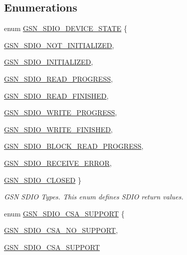 \subsection*{Enumerations}
\begin{DoxyCompactItemize}
\item 
enum \hyperlink{a00653_gaa3d282bc619a73a9e7363293b8f26cdf}{GSN\_\-SDIO\_\-DEVICE\_\-STATE} \{ \par
\hyperlink{a00653_ggaa3d282bc619a73a9e7363293b8f26cdfa1e214f0257d6a9a7cba80d685a8b1880}{GSN\_\-SDIO\_\-NOT\_\-INITIALIZED}, 
\par
\hyperlink{a00653_ggaa3d282bc619a73a9e7363293b8f26cdfa4db5af1bfb4d5589af139e930823d991}{GSN\_\-SDIO\_\-INITIALIZED}, 
\par
\hyperlink{a00653_ggaa3d282bc619a73a9e7363293b8f26cdfa83dfb0b4c0620cf4a85cbd52233e7030}{GSN\_\-SDIO\_\-READ\_\-PROGRESS}, 
\par
\hyperlink{a00653_ggaa3d282bc619a73a9e7363293b8f26cdfa3ac1c651a364e447a8358aab28083933}{GSN\_\-SDIO\_\-READ\_\-FINISHED}, 
\par
\hyperlink{a00653_ggaa3d282bc619a73a9e7363293b8f26cdfa999232b9670af3678f9402ad4d8dc0bd}{GSN\_\-SDIO\_\-WRITE\_\-PROGRESS}, 
\par
\hyperlink{a00653_ggaa3d282bc619a73a9e7363293b8f26cdfac5e2ddee6eeb20c69a6aded95c8f87a2}{GSN\_\-SDIO\_\-WRITE\_\-FINISHED}, 
\par
\hyperlink{a00653_ggaa3d282bc619a73a9e7363293b8f26cdfac918198a49746d79497ffe46536c5608}{GSN\_\-SDIO\_\-BLOCK\_\-READ\_\-PROGRESS}, 
\par
\hyperlink{a00653_ggaa3d282bc619a73a9e7363293b8f26cdfaec19b191146823868f3abaa22f86d4ff}{GSN\_\-SDIO\_\-RECEIVE\_\-ERROR}, 
\par
\hyperlink{a00653_ggaa3d282bc619a73a9e7363293b8f26cdfa1257e3f3ab69a7f527f6c8d792fc36c5}{GSN\_\-SDIO\_\-CLOSED}
 \}
\begin{DoxyCompactList}\small\item\em GSN SDIO Types. This enum defines SDIO return values. \end{DoxyCompactList}\item 
enum \hyperlink{a00653_gaf684dd62de548c59407b206cb1a0251c}{GSN\_\-SDIO\_\-CSA\_\-SUPPORT} \{ \par
\hyperlink{a00653_ggaf684dd62de548c59407b206cb1a0251ca966180d41a1bee964d8209ffd63fe9cd}{GSN\_\-SDIO\_\-CSA\_\-NO\_\-SUPPORT}, 
\par
\hyperlink{a00653_ggaf684dd62de548c59407b206cb1a0251ca8b135a9e2f08a74bda2fd5a6822b9a74}{GSN\_\-SDIO\_\-CSA\_\-SUPPORT}

\end{DoxyCompactItemize}
